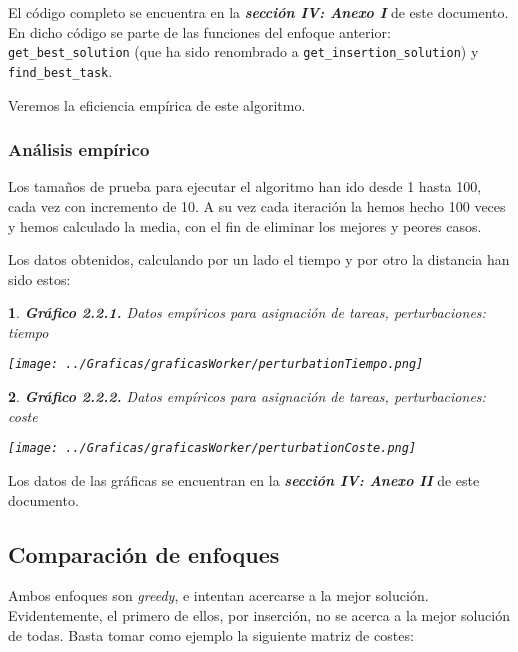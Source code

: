\documentclass[10pt, a4paper]{article}
\theoremstyle{theorem-style}
\newtheorem*{datos}{}
\theoremstyle{theorem-style}
\theoremstyle{definition-style}
\theoremstyle{remark-style}
\theoremstyle{example-style}
\theoremstyle{definition-style}
\theoremstyle{remark-style}
\begin{document}
El código completo se encuentra en la \textbf{\emph{sección IV: Anexo I}} de este documento. En dicho código se parte de las funciones del enfoque anterior: \texttt{get\_best\_solution} (que ha sido renombrado a \texttt{get\_insertion\_solution}) y \texttt{find\_best\_task}.

Veremos la eficiencia empírica de este algoritmo.

\subsubsection*{Análisis empírico}
Los tamaños de prueba para ejecutar el algoritmo han ido desde 1 hasta 100, cada vez con incremento de 10. A su vez cada iteración la hemos hecho 100 veces y hemos calculado la media, con el fin de eliminar los mejores y peores casos.  

Los datos obtenidos, calculando por un lado el tiempo y por otro la distancia han sido estos:

\begin{datos}
	{\bf\sffamily Gráfico 2.2.1.} {\sffamily Datos empíricos para asignación de tareas, perturbaciones: tiempo}\\
	\vspace{-0.7cm}
	\begin{center}
		\texttt{[image: ../Graficas/graficasWorker/perturbationTiempo.png]}
	\end{center}	
\end{datos}

\begin{datos}
	{\bf\sffamily Gráfico 2.2.2.} {\sffamily Datos empíricos para asignación de tareas, perturbaciones: coste}\\
	\vspace{-0.7cm}
	\begin{center}
		\texttt{[image: ../Graficas/graficasWorker/perturbationCoste.png]}
	\end{center}	
\end{datos}

Los datos de las gráficas se encuentran en la \textbf{\emph{sección IV: Anexo II}} de este documento.

\subsection{Comparación de enfoques}

Ambos enfoques son \emph{greedy}, e intentan acercarse a la mejor solución. Evidentemente, el primero de ellos, por inserción, no se acerca a la mejor solución de todas. Basta tomar como ejemplo la siguiente matriz de costes:
\end{document}
